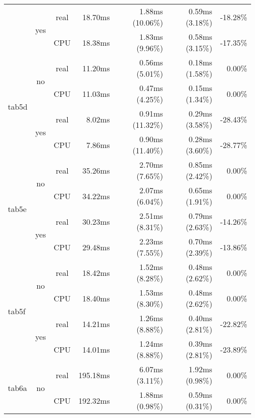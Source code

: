 \documentclass[en]{pracamgr}
\begin{document}
\begin{appendices}
\begin{small}
\begin{longtable}{|l|c|c|r|r|r|r|}
                          \cline{2-7}
                          & \multirow{2}{*}{yes} & real & 18.70ms & 1.88ms (10.06\%) & 0.59ms (3.18\%) & -18.28\% \\*
                          &                      & CPU  & 18.38ms & 1.83ms (9.96\%) & 0.58ms (3.15\%) & -17.35\% \\
\hline
\multirow{4}{*}{tab5d}    & \multirow{2}{*}{no}  & real & 11.20ms & 0.56ms (5.01\%) & 0.18ms (1.58\%) & 0.00\% \\*
                          &                      & CPU  & 11.03ms & 0.47ms (4.25\%) & 0.15ms (1.34\%) & 0.00\% \\*
                          \cline{2-7}
                          & \multirow{2}{*}{yes} & real & 8.02ms & 0.91ms (11.32\%) & 0.29ms (3.58\%) & -28.43\% \\*
                          &                      & CPU  & 7.86ms & 0.90ms (11.40\%) & 0.28ms (3.60\%) & -28.77\% \\
\hline
\multirow{4}{*}{tab5e}    & \multirow{2}{*}{no}  & real & 35.26ms & 2.70ms (7.65\%) & 0.85ms (2.42\%) & 0.00\% \\*
                          &                      & CPU  & 34.22ms & 2.07ms (6.04\%) & 0.65ms (1.91\%) & 0.00\% \\*
                          \cline{2-7}
                          & \multirow{2}{*}{yes} & real & 30.23ms & 2.51ms (8.31\%) & 0.79ms (2.63\%) & -14.26\% \\*
                          &                      & CPU  & 29.48ms & 2.23ms (7.55\%) & 0.70ms (2.39\%) & -13.86\% \\
\hline
\multirow{4}{*}{tab5f}    & \multirow{2}{*}{no}  & real & 18.42ms & 1.52ms (8.28\%) & 0.48ms (2.62\%) & 0.00\% \\*
                          &                      & CPU  & 18.40ms & 1.53ms (8.30\%) & 0.48ms (2.62\%) & 0.00\% \\*
                          \cline{2-7}
                          & \multirow{2}{*}{yes} & real & 14.21ms & 1.26ms (8.88\%) & 0.40ms (2.81\%) & -22.82\% \\*
                          &                      & CPU  & 14.01ms & 1.24ms (8.88\%) & 0.39ms (2.81\%) & -23.89\% \\
\hline
\multirow{4}{*}{tab6a}    & \multirow{2}{*}{no}  & real & 195.18ms & 6.07ms (3.11\%) & 1.92ms (0.98\%) & 0.00\% \\*
                          &                      & CPU  & 192.32ms & 1.88ms (0.98\%) & 0.59ms (0.31\%) & 0.00\% \\*

\end{longtable}
\end{small}
\end{appendices}
\end{document}
